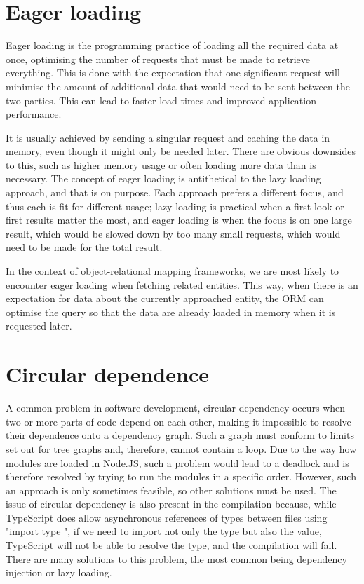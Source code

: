 \section{Eager loading}
Eager loading is the programming practice of loading all the required data at
once, optimising the number of requests that must be made to retrieve
everything. This is done with the expectation that one significant request will
minimise the amount of additional data that would need to be sent between the
two parties. This can lead to faster load times and improved application
performance.

It is usually achieved by sending a singular request and caching the data in
memory, even though it might only be needed later. There are obvious downsides
to this, such as higher memory usage or often loading more data than is
necessary. The concept of eager loading is antithetical to the lazy loading
approach, and that is on purpose. Each approach prefers a different focus, and
thus each is fit for different usage; lazy loading is practical when a first
look or first results matter the most, and eager loading is when the focus is on
one large result, which would be slowed down by too many small requests, which
would need to be made for the total result.

In the context of object-relational mapping frameworks, we are most likely to
encounter eager loading when fetching related entities. This way, when there is
an expectation for data about the currently approached entity, the ORM can
optimise the query so that the data are already loaded in memory when it is
requested later.


\section{Circular dependence}
A common problem in software development, circular dependency occurs when two or
more parts of code depend on each other, making it impossible to resolve their
dependence onto a dependency graph. Such a graph must conform to limits set out
for tree graphs and, therefore, cannot contain a loop. Due to the way how
modules are loaded in Node.JS, such a problem would lead to a deadlock and is
therefore resolved by trying to run the modules in a specific order. However,
such an approach is only sometimes feasible, so other solutions must be used.
The issue of circular dependency is also present in the compilation because,
while TypeScript does allow asynchronous references of types between files using
"import type ", if we need to import not only the type but also the value,
TypeScript will not be able to resolve the type, and the compilation will fail.
There are many solutions to this problem, the most common being dependency
injection or lazy loading.


